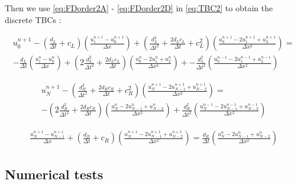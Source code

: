 \normalsize

\indent Then we use \eqref{eq:FDorder2A} - \eqref{eq:FDorder2D} in \eqref{eq:TBC2} to obtain the discrete TBCs :

\small

\begin{equation}
	\begin{aligned}
    u_0^{n+1} - \left( \frac{d_L}{\Delta t} + c_L \right) \left( \frac{u_1^{n+1} - u_0^{n+1}}{\Delta x}\right) +   \left( \frac{d_L^2}{\Delta t^2} + \frac{2d_Lc_L}{\Delta t} + c_L^2  \right) \left(  \frac{u_0^{n+1} - 2u_1^{n+1} + u_2^{n+1}}{\Delta x^2} \right)  = \\
        -\frac{d_L}{\Delta t}\left( \frac{u_1^{n} - u_0^{n}}{\Delta x}\right) +  \left( 2\frac{d_L^2}{\Delta t^2} + \frac{2d_Lc_L}{\Delta t}\right) \left(  \frac{u_0^{n} - 2u_1^n + u_2^{n}}{\Delta x^2} \right) +   -  \frac{d_L^2}{\Delta t^2} \left(  \frac{u_0^{n-1} - 2u_1^{n-1} + u_2^{n-1}}{\Delta x^2} \right)
   \end{aligned}
\end{equation} 

\begin{equation}
	\begin{aligned}
    u_N^{n+1} - \left( \frac{d_R^2}{\Delta t^2} + \frac{2d_Rc_R}{\Delta t} + c_R^2  \right) \left(  \frac{u_{N}^{n+1} - 2u_{N-1}^{n+1} + u_{N-2}^{n+1}}{\Delta x^2} \right) = \\
     -\left( 2\frac{d_R^2}{\Delta t^2} + \frac{2d_Rc_R}{\Delta t}\right) \left(  \frac{u_N^{n} - 2u_{N-1}^n + u_{N-2}^{n}}{\Delta x^2} \right) + \frac{d_R^2}{\Delta t^2} \left(  \frac{u_N^{n-1} - 2u_{N-1}^{n-1} + u_{N-2}^{n-1}}{\Delta x^2} \right)
    \end{aligned}
\end{equation} 
   
\begin{equation}
	\begin{aligned}	
    \frac{u_N^{n+1} - u_{N-1}^{n+1}}{\Delta x} + \left( \frac{d_R}{\Delta t} + c_R \right) \left( \frac{u_N^{n+1} -2 u_{N-1}^{n+1} + u_{N-2}^{n+1}}{\Delta x^2}\right) =      \frac{d_R}{\Delta t}\left( \frac{u_{N}^{n} - 2u_{N-1}^{n} + u_{N-2}^n}{\Delta x^2}\right)
    \end{aligned}
\end{equation}

\normalsize

\subsection{Numerical tests}


